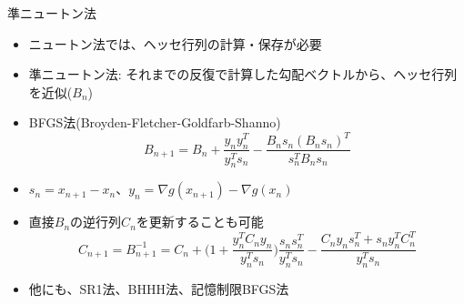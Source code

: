 \begin{frame}[t,fragile]{準ニュートン法}
  \begin{itemize}
  \item ニュートン法では、ヘッセ行列の計算・保存が必要
  \item 準ニュートン法: それまでの反復で計算した勾配ベクトルから、ヘッセ行列を近似($B_n$)
  \item BFGS法(Broyden-Fletcher-Goldfarb-Shanno)
    \[
    B_{n+1} = B_{n} + \frac{y_n y_n^T}{y_n^T s_n} - \frac{B_{n} s_n (B_{n} s_n)^T}{s_n^T B_n s_n}
    \]
  \item $s_n = x_{n+1} - x_n$、$y_n = \nabla g(x_{n+1}) - \nabla g(x_n)$
  \item 直接$B_{n}$の逆行列$C_{n}$を更新することも可能
    \[
    C_{n+1} = B_{n+1}^{-1} = C_n + \Big( 1 + \frac{y_n^T C_n y_n}{y_n^T s_n} \Big)
    \frac{s_n s_n^T}{y_n^T s_n} - \frac{C_n y_n s_n^T + s_n y_n^T C_n^T}{y_n^T s_n} \]
  \item 他にも、SR1法、BHHH法、記憶制限BFGS法
  \end{itemize}
\end{frame}
